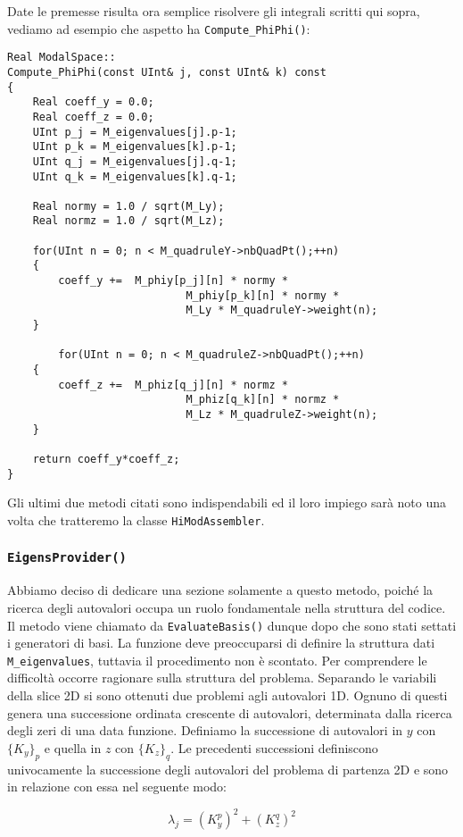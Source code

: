 Date le premesse risulta ora semplice risolvere gli integrali scritti qui sopra, vediamo ad esempio che aspetto ha \texttt{Compute\_PhiPhi()}:


\begin{lstlisting}[style = general]
Real ModalSpace::
Compute_PhiPhi(const UInt& j, const UInt& k) const
{
	Real coeff_y = 0.0;
	Real coeff_z = 0.0;
	UInt p_j = M_eigenvalues[j].p-1;
	UInt p_k = M_eigenvalues[k].p-1;
	UInt q_j = M_eigenvalues[j].q-1;
	UInt q_k = M_eigenvalues[k].q-1;
	
	Real normy = 1.0 / sqrt(M_Ly);
	Real normz = 1.0 / sqrt(M_Lz);
	
	for(UInt n = 0; n < M_quadruleY->nbQuadPt();++n)
	{
		coeff_y +=	M_phiy[p_j][n] * normy *	
							M_phiy[p_k][n] * normy *
							M_Ly * M_quadruleY->weight(n);
	}
	
		for(UInt n = 0; n < M_quadruleZ->nbQuadPt();++n)
	{
		coeff_z +=	M_phiz[q_j][n] * normz *	
							M_phiz[q_k][n] * normz *
							M_Lz * M_quadruleZ->weight(n);
	}
	
	return coeff_y*coeff_z;
}
\end{lstlisting}
 
 Gli ultimi due metodi citati sono indispendabili ed il loro impiego sar\`a noto una volta che tratteremo la classe \texttt{HiModAssembler}.
 
 \subsubsection{\texttt{EigensProvider()}}
 Abbiamo deciso di dedicare una sezione solamente a questo metodo, poich\'e la ricerca degli autovalori occupa un ruolo fondamentale nella struttura del codice.
 Il metodo viene chiamato da \texttt{EvaluateBasis()} dunque dopo che sono stati settati i generatori di basi. La funzione deve preoccuparsi di definire la struttura dati \texttt{M\_eigenvalues}, tuttavia il procedimento non \`e scontato. 
 Per comprendere le difficolt\`a occorre ragionare sulla struttura del problema. Separando le variabili della slice 2D si sono ottenuti due problemi agli autovalori 1D. Ognuno di questi genera una successione ordinata crescente di autovalori, determinata dalla ricerca degli zeri di una data funzione. Definiamo la successione di autovalori in $y$ con $\{K_y\}_p$ e quella in $z$ con $\{K_z\}_q$. Le precedenti successioni definiscono univocamente la successione degli autovalori del problema di partenza 2D e sono in relazione con essa nel seguente modo:

\begin{equation}
\label{eq: autovalori}
 \lambda_j = (K_y^p)^2 + (K_z^q)^2
\end{equation} 

